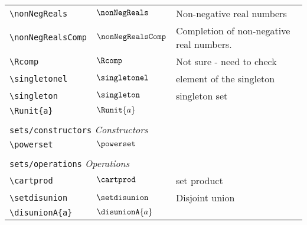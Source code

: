 \begin{longtable}{lll}
  {\color[rgb]{0.5,0.5,0.5}\texttt{\textbackslash nonNegReals}}                                             & $\nonNegReals$             & Non-negative real numbers\\
  {\color[rgb]{0.5,0.5,0.5}\texttt{\textbackslash nonNegRealsComp}}                                         & $\nonNegRealsComp$
  & Completion of non-negative real numbers.\\
  {\color[rgb]{0.5,0.5,0.5}\texttt{\textbackslash Rcomp}}                                                   & $\Rcomp$                   & Not sure - need to check\\
  {\color[rgb]{0.5,0.5,0.5}\texttt{\textbackslash singletonel}}                                             & $\singletonel$             & element of the singleton\\
  {\color[rgb]{0.5,0.5,0.5}\texttt{\textbackslash singleton}}                                               & $\singleton$               & singleton set\\
  {\color[rgb]{0.5,0.5,0.5}\texttt{\textbackslash Runit\{a\}}}                                              & $\Runit{a}$                &                                                         \\
  &                            &                                                         \\
  \multicolumn{3}{l}{{\color[rgb]{0.5,0.5,0.5}\texttt{sets/constructors}} \emph{Constructors}}
  \\
  \hline
  {\color[rgb]{0.5,0.5,0.5}\texttt{\textbackslash powerset}}                                                & $\powerset$                &                                                         \\
  &                            &                                                         \\
  \multicolumn{3}{l}{{\color[rgb]{0.5,0.5,0.5}\texttt{sets/operations}} \emph{Operations}}
  \\
  \hline
  {\color[rgb]{0.5,0.5,0.5}\texttt{\textbackslash cartprod}}                                                & $\cartprod$                & set product\\
  {\color[rgb]{0.5,0.5,0.5}\texttt{\textbackslash setdisunion}}                                             & $\setdisunion$             & Disjoint union\\
  {\color[rgb]{0.5,0.5,0.5}\texttt{\textbackslash disunionA\{a\}}}                                          & $\disunionA{a}$
  & \\

\end{longtable}

